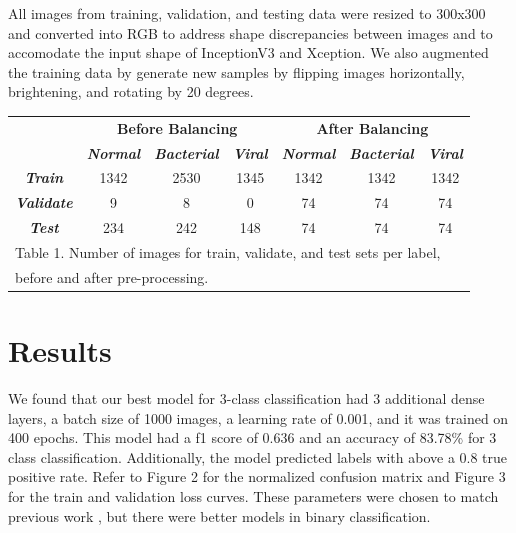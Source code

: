 \documentclass[conference]{IEEEtran}
\begin{document}
All images from training, validation, and testing data were resized to 300x300 and converted into RGB to address shape discrepancies between images and to accomodate the input shape of InceptionV3 and Xception. We also augmented the training data by generate new samples by flipping images horizontally, brightening, and rotating by 20 degrees. 

\begin{table}[htbp]
\begin{center}
\begin{tabular}{|c|c|c|c|c|c|c|}
\hline
&\multicolumn{3}{|c|}{\textbf{Before Balancing}}&\multicolumn{3}{|c|}{\textbf{ After Balancing}} \\
\cline{2-7} 
& \textbf{\textit{Normal}} & \textbf{\textit{Bacterial}}& \textbf{\textit{Viral}} & \textbf{\textit{Normal}} & \textbf{\textit{Bacterial}}& \textbf{\textit{Viral}} \\
\hline
\textbf{\textit{Train}} & 1342 & 2530 & 1345 & 1342 & 1342 & 1342 \\
\hline
\textbf{\textit{Validate}} & 9 & 8 & 0 & 74 & 74 & 74\\ \hline
\textbf{\textit{Test}} & 234 & 242 & 148 & 74 & 74 & 74\\ \hline
\multicolumn{7}{l}{Table 1. Number of images for train, validate, and test sets per label,}\\
\multicolumn{7}{l}{ before and after pre-processing.}
\end{tabular}
\label{Tab:Tcr}
\end{center}
\end{table}

\section{Results}
We found that our best model for 3-class classification had 3 additional dense layers, a batch size of 1000 images, a learning rate of 0.001, and it was trained on 400 epochs. This model had a f1 score of 0.636 and an accuracy of 83.78\% for 3 class classification. Additionally, the model predicted labels with above a 0.8 true positive rate. Refer to Figure 2 for the normalized confusion matrix and Figure 3 for the train and validation loss curves. These parameters were chosen to match previous work \cite{kermany2018identifying}, but there were better models in binary classification. 
\end{document}
